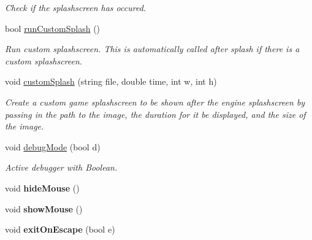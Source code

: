 \begin{DoxyCompactItemize}
\begin{DoxyCompactList}\small\item\em Check if the splashscreen has occured. \end{DoxyCompactList}\item 
bool \hyperlink{classEngine_a5c87c90c9dd6b3fd652e24af0c7e935d}{run\+Custom\+Splash} ()\hypertarget{classEngine_a5c87c90c9dd6b3fd652e24af0c7e935d}{}\label{classEngine_a5c87c90c9dd6b3fd652e24af0c7e935d}

\begin{DoxyCompactList}\small\item\em Run custom splashscreen. This is automatically called after splash if there is a custom splashscreen. \end{DoxyCompactList}\item 
void \hyperlink{classEngine_a0960e415d0b9ed92099eee6677d7ea51}{custom\+Splash} (string file, double time, int w, int h)\hypertarget{classEngine_a0960e415d0b9ed92099eee6677d7ea51}{}\label{classEngine_a0960e415d0b9ed92099eee6677d7ea51}

\begin{DoxyCompactList}\small\item\em Create a custom game splashscreen to be shown after the engine splashscreen by passing in the path to the image, the duration for it be displayed, and the size of the image. \end{DoxyCompactList}\item 
void \hyperlink{classEngine_a60d5307c4bc5005119086ff9f3e21624}{debug\+Mode} (bool d)\hypertarget{classEngine_a60d5307c4bc5005119086ff9f3e21624}{}\label{classEngine_a60d5307c4bc5005119086ff9f3e21624}

\begin{DoxyCompactList}\small\item\em Active debugger with Boolean. \end{DoxyCompactList}\item 
void {\bfseries hide\+Mouse} ()\hypertarget{classEngine_ab28645d6809f5335cc9034caaba38827}{}\label{classEngine_ab28645d6809f5335cc9034caaba38827}

\item 
void {\bfseries show\+Mouse} ()\hypertarget{classEngine_a6d476e93e46e59543ea9714b93a30936}{}\label{classEngine_a6d476e93e46e59543ea9714b93a30936}

\item 
void {\bfseries exit\+On\+Escape} (bool e)\hypertarget{classEngine_abe0b98e24e2f28d316df4eec13ab92c8}{}\label{classEngine_abe0b98e24e2f28d316df4eec13ab92c8}


\end{DoxyCompactItemize}
